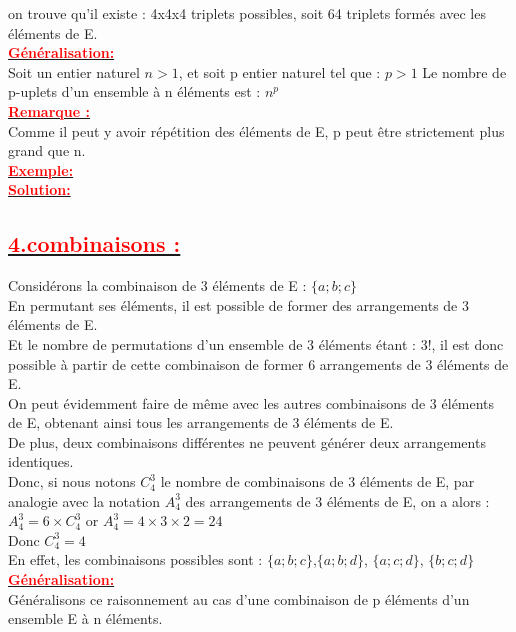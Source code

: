 \documentclass[12pt]{article}
\begin{document}
on trouve qu’il existe : 4x4x4 triplets possibles, soit 64 triplets formés avec les éléments de E.\\
\underline{\textbf{\textcolor{red}{Généralisation:}}}\\
Soit un entier naturel $n > 1$, et soit p entier naturel tel que : $p > 1$
Le nombre de p-uplets d’un ensemble à n éléments est : $n^{p}$\\
\underline{\textbf{\textcolor{red}{Remarque :}}}\\
Comme il peut y avoir répétition des éléments de E, p peut être strictement plus grand que n.\\
\underline{\textbf{\textcolor{red}{Exemple:}}}\\ 
\underline{\textbf{\textcolor{red}{Solution:}}}\\
\subsection*{\underline{\textbf{\textcolor{red}{4.combinaisons :}}}}
 Considérons la combinaison de 3 éléments de E : $\lbrace a ; b ; c \rbrace$\\
En permutant ses éléments, il est possible de former des arrangements de 3 éléments de E.\\

Et le nombre de permutations d’un ensemble de 3 éléments étant : 3!, il est donc possible à partir de cette combinaison de former 6 arrangements de 3 éléments de E.\\
On peut évidemment faire de même avec les autres combinaisons de 3 éléments de E, obtenant ainsi tous les arrangements de 3 éléments de E.\\

De plus, deux combinaisons différentes ne peuvent générer deux arrangements identiques.\\
Donc, si nous notons $C^{3}_{4}$ le nombre de combinaisons de 3 éléments de E, par analogie avec la notation $A^{3}_{4}$ des arrangements de 3 éléments de E, on a alors : $A^{3}_{4}=6 \times C^{3}_{4}$ or 
$A^{3}_{4}=4\times3\times2=24$\\ Donc $C^{3}_{4}=4$\\
En effet, les combinaisons possibles sont : $\lbrace a ; b ; c \rbrace$,$\lbrace a ; b ; d \rbrace$,
$\lbrace a ; c ; d \rbrace$, $\lbrace b ; c ; d \rbrace$\\
\underline{\textbf{\textcolor{red}{Généralisation:}}}\\
Généralisons ce raisonnement au cas d’une combinaison de p éléments
d’un ensemble E à n éléments.\\
\end{document}
